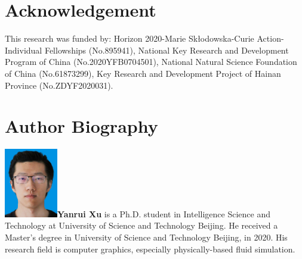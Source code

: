 \documentclass[VANCOUVER,STIX1COL]{WileyNJD-v2}
\providecommand{\DIFaddbegin}{} %
\providecommand{\DIFaddend}{} %
\providecommand{\DIFdelbegin}{} %
\providecommand{\DIFdelend}{} %
\begin{document}

\section*{Acknowledgement}
This research was funded by: Horizon 2020-Marie Skłodowska-Curie Action-Individual Fellowships (No.895941), National Key Research and Development Program of China (No.2020YFB0704501), National Natural Science Foundation of China (No.61873299), Key Research and Development Project of Hainan Province (No.ZDYF2020031).

\nocite{*}%


\section*{Author Biography}

\DIFdelbegin %
\DIFdelend \DIFaddbegin \begin{biography}{\includegraphics[width=66pt,height=86pt]{VANCOUVER/figure/photos/YanruiXu.jpg}}{\textbf{Yanrui Xu} is a Ph.D. student in Intelligence Science and Technology at University of Science and Technology Beijing. He received a Master's degree in University of Science and Technology Beijing, in 2020. His research field is computer graphics, especially physically-based fluid simulation.}
\DIFaddend \end{biography}
\end{document}
